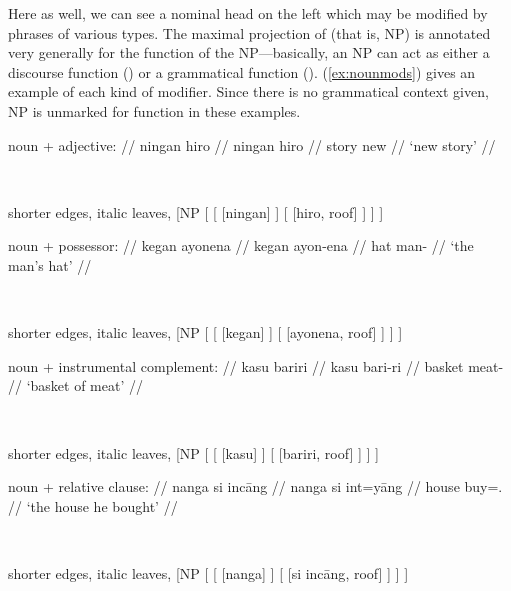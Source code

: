 Here as well, we can see a nominal head on the left which may be modified by
phrases of various types. The maximal projection of  (that is, NP) is
annotated very generally for the function of the NP---basically, an NP can act
as either a discourse function (\DF{}) or a grammatical function (\GF{}). 
(\ref{ex:nounmods}) gives an example of each kind of modifier. Since there is 
no grammatical context given, NP is unmarked for function in these examples.

\pex\label{ex:nounmods}
\a %
	\begin{minipage}[t]{.5\remaining}
	\begingl
		\glpreamble noun + adjective: //
		\gla ningan hiro //
		\glb ningan hiro //
		\glc story new //
		\glft `new story' //
	\endgl
	\end{minipage}
	~
	\begin{forest} shorter edges, italic leaves,
	[NP
		[
			[
				[{ningan}]
			]
			[{}
				[{hiro}, roof]
			]
		]
	]
	\end{forest}

\a %
	\begin{minipage}[t]{.5\remaining}
	\begingl
		\glpreamble noun + possessor: //
		\gla kegan ayonena //
		\glb kegan ayon-ena //
		\glc hat man-\Gen{} //
		\glft `the man's hat' //
	\endgl
	\end{minipage}
	~
	\begin{forest} shorter edges, italic leaves,
	[NP
		[
			[
				[{kegan}]
			]
			[{}
				[{ayonena}, roof]
			]
		]
	]
	\end{forest}

\a %
	\begin{minipage}[t]{.5\remaining}
	\begingl
		\glpreamble noun + instrumental complement: //
		\gla kasu bariri //
		\glb kasu bari-ri //
		\glc basket meat-\Ins{} //
		\glft `basket of meat' //
	\endgl
	\end{minipage}
	~
	\begin{forest} shorter edges, italic leaves,
	[NP
		[
			[
				[{kasu}]
			]
			[{}
				[{bariri}, roof]
			]
		]
	]
	\end{forest}

\a %
	\begin{minipage}[t]{.5\remaining}
	\begingl
		\glpreamble noun + relative clause: //
		\gla nanga si incāng //
		\glb nanga si int=yāng //
		\glc house \Rel{} buy=\TsgM{}.\Aarg{} //
		\glft `the house he bought' //
	\endgl
	\end{minipage}
	~
	\begin{forest} shorter edges, italic leaves,
	[NP
		[
			[
				[{nanga}]
			]
			[{}
				[{si incāng}, roof]
			]
		]
	]
	\end{forest}

